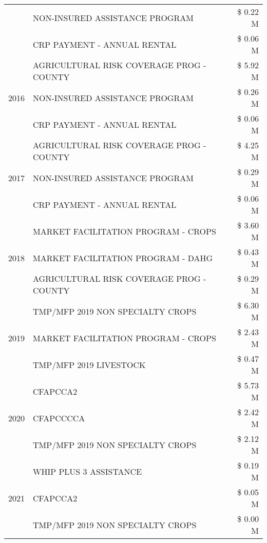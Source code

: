\begin{tabular}{llr}
 & NON-INSURED ASSISTANCE PROGRAM & \$ 0.22 M \\
 & CRP PAYMENT - ANNUAL RENTAL & \$ 0.06 M \\
\cline{1-3}
\multirow[t]{3}{*}{2016} & AGRICULTURAL RISK COVERAGE PROG - COUNTY & \$ 5.92 M \\
 & NON-INSURED ASSISTANCE PROGRAM & \$ 0.26 M \\
 & CRP PAYMENT - ANNUAL RENTAL & \$ 0.06 M \\
\cline{1-3}
\multirow[t]{3}{*}{2017} & AGRICULTURAL RISK COVERAGE PROG - COUNTY & \$ 4.25 M \\
 & NON-INSURED ASSISTANCE PROGRAM & \$ 0.29 M \\
 & CRP PAYMENT - ANNUAL RENTAL & \$ 0.06 M \\
\cline{1-3}
\multirow[t]{3}{*}{2018} & MARKET FACILITATION PROGRAM - CROPS & \$ 3.60 M \\
 & MARKET FACILITATION PROGRAM - DAHG & \$ 0.43 M \\
 & AGRICULTURAL RISK COVERAGE PROG - COUNTY & \$ 0.29 M \\
\cline{1-3}
\multirow[t]{3}{*}{2019} & TMP/MFP 2019 NON SPECIALTY CROPS & \$ 6.30 M \\
 & MARKET FACILITATION PROGRAM - CROPS & \$ 2.43 M \\
 & TMP/MFP 2019 LIVESTOCK & \$ 0.47 M \\
\cline{1-3}
\multirow[t]{3}{*}{2020} & CFAPCCA2 & \$ 5.73 M \\
 & CFAPCCCCA & \$ 2.42 M \\
 & TMP/MFP 2019 NON SPECIALTY CROPS & \$ 2.12 M \\
\cline{1-3}
\multirow[t]{3}{*}{2021} & WHIP PLUS 3 ASSISTANCE & \$ 0.19 M \\
 & CFAPCCA2 & \$ 0.05 M \\
 & TMP/MFP 2019 NON SPECIALTY CROPS & \$ 0.00 M \\
\cline{1-3}
\bottomrule
\end{tabular}
